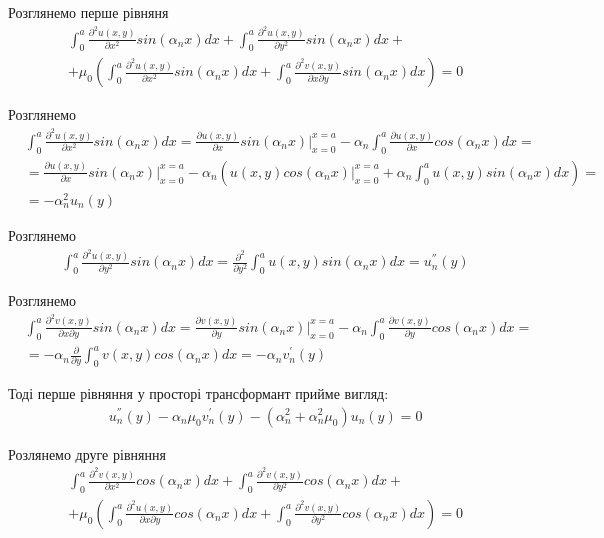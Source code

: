 Розглянемо перше рівняня
\begin{align*}
    &\int_{0}^{a} \frac{\partial^2 u(x,y)}{\partial x^2} sin(\alpha_n x)dx + \int_{0}^{a} \frac{\partial^2 u(x,y)}{\partial y^2} sin(\alpha_n x)dx + \\ 
    & + \mu_0 \left( \int_{0}^{a} \frac{\partial^2 u(x,y)}{\partial x^2} sin(\alpha_n x)dx + \int_{0}^{a} \frac{\partial^2 v(x,y)}{\partial x \partial y} sin(\alpha_n x) dx\right) = 0
\end{align*}

Розглянемо
\begin{align*}
    &\int_{0}^{a} \frac{\partial^2 u(x,y)}{\partial x^2} sin(\alpha_n x)dx = \frac{\partial u(x,y)}{\partial x} sin(\alpha_n x) |_{x=0}^{x=a} - \alpha_n \int_{0}^{a} \frac{\partial u(x,y)}{\partial x} cos(\alpha_n x)dx = \\
    &= \frac{\partial u(x,y)}{\partial x} sin(\alpha_n x) |_{x=0}^{x=a} - \alpha_n \left( u(x,y) cos(\alpha_n x) |_{x=0}^{x=a} + \alpha_n \int_{0}^{a} u(x,y) sin(\alpha_n x) dx \right) = \\
    &= -\alpha_n^2 u_n(y)
\end{align*}

Розглянемо
\begin{align*}
    &\int_{0}^{a} \frac{\partial^2 u(x,y)}{\partial y^2} sin(\alpha_n x)dx = \frac{\partial^2}{\partial y^2} \int_{0}^{a} u(x,y) sin(\alpha_n x)dx = u_n^{''}(y)
\end{align*}

Розглянемо
\begin{align*}
    &\int_{0}^{a} \frac{\partial^2 v(x,y)}{\partial x \partial y} sin(\alpha_n x) dx = \frac{\partial v(x,y)}{\partial y} sin(\alpha_n x) |_{x=0}^{x=a} - \alpha_n \int_{0}^{a} \frac{\partial v(x,y)}{\partial y} cos(\alpha_n x) dx = \\
    &= -\alpha_n \frac{\partial}{\partial y} \int_{0}^{a} v(x,y) cos(\alpha_n x) dx = -\alpha_n v_n^{'}(y)
\end{align*}

Тоді перше рівняння у просторі трансформант прийме вигляд:
\begin{align*}
    &u_n^{''}(y) - \alpha_n \mu_0 v_n^{'}(y) -(\alpha_n^2 + \alpha_n^2 \mu_0) u_n(y) = 0
\end{align*}

Розлянемо друге рівняння
\begin{align*}
    &\int_{0}^{a} \frac{\partial^2 v(x,y)}{\partial x^2} cos(\alpha_n x)dx + \int_{0}^{a} \frac{\partial^2 v(x,y)}{\partial y^2} cos(\alpha_n x)dx + \\ 
    & + \mu_0 \left( \int_{0}^{a} \frac{\partial^2 u(x,y)}{\partial x \partial y} cos(\alpha_n x)dx +  \int_{0}^{a} \frac{\partial^2 v(x,y)}{\partial y^2} cos(\alpha_n x) dx\right) = 0
\end{align*}

